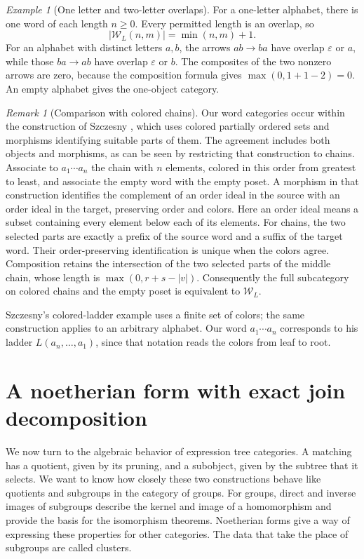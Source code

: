 \documentclass[11pt,a4paper]{article}
\theoremstyle{plain}
\theoremstyle{definition}
\theoremstyle{remark}
\newtheorem{remark}[theorem]{Remark}
\newtheorem{example}[theorem]{Example}
\begin{document}
\begin{example}[One letter and two-letter overlaps]\label{ex:wordexamples}
For a one-letter alphabet, there is one word of each length
$n\ge0$. Every permitted length is an overlap, so
\[
 |\mathcal W_L(n,m)|=\min(n,m)+1.
\]
For an alphabet with distinct letters $a,b$, the arrows
$ab\to ba$ have overlap $\varepsilon$ or $a$, while those
$ba\to ab$ have overlap $\varepsilon$ or $b$.
The composites of the two nonzero arrows are zero, because the
composition formula gives $\max(0,1+1-2)=0$.
An empty alphabet gives the one-object category.
\end{example}

\begin{remark}[Comparison with colored chains]
Our word categories occur within the construction of Szczesny
\cite[Section~3.2.1 and Example~7]{SzczesnyPreLie}, which uses
colored partially ordered sets and morphisms identifying suitable
parts of them. The agreement includes both objects and morphisms,
as can be seen by restricting that construction to chains.
Associate to $a_1\cdots a_n$ the chain with $n$ elements, colored
in this order from greatest to least, and associate the empty word
with the empty poset. A morphism in that construction identifies
the complement of an order ideal in the source with an order ideal
in the target, preserving order and colors. Here an order ideal
means a subset containing every element below each of its elements.
For chains, the two selected parts are exactly a prefix of the
source word and a suffix of the target word. Their order-preserving
identification is unique when the colors agree. Composition retains
the intersection of the two selected parts of the middle chain,
whose length is $\max(0,r+s-|v|)$. Consequently the full subcategory
on colored chains and the empty poset is equivalent to
$\mathcal W_L$.

Szczesny's colored-ladder example uses a finite set of colors; the
same construction applies to an arbitrary alphabet. Our word
$a_1\cdots a_n$ corresponds to his ladder $L(a_n,\ldots,a_1)$,
since that notation reads the colors from leaf to root.
\end{remark}

\section{A noetherian form with exact join decomposition}\label{sec:cosubquotients}
We now turn to the algebraic behavior of expression tree categories.
A matching has a quotient, given by its pruning, and a subobject,
given by the subtree that it selects. We want to know how closely
these two constructions behave like quotients and subgroups in the
category of groups. For groups, direct and inverse images of
subgroups describe the kernel and image of a homomorphism and
provide the basis for the isomorphism theorems. Noetherian forms
give a way of expressing these properties for other categories.
The data that take the place of subgroups are called clusters.
\end{document}
